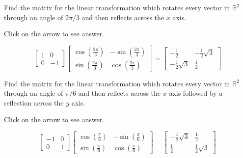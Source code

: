 \documentclass{ximera}
\begin{document}
\begin{problem}\label{prb:6.16} Find the matrix for the linear transformation which rotates every
vector in $\mathbb{R}^{2}$ through an angle of $2\pi /3$ and then reflects
across the $x$ axis.

Click on the arrow to see answer.
\begin{expandable}
\[
\left[
\begin{array}{rr}
1 & 0 \\
0 & -1
\end{array}
\right] \left[
\begin{array}{cc}
\cos \left( \frac{2\pi }{3}\right)  & -\sin \left( \frac{2\pi }{3}\right)
\\
\sin \left( \frac{2\pi }{3}\right)  & \cos \left( \frac{2\pi }{3}\right)
\end{array}
\right] = \left[
\begin{array}{cc}
-\frac{1}{2} & -\frac{1}{2}\sqrt{3} \\
-\frac{1}{2}\sqrt{3} & \frac{1}{2}
\end{array}
\right]
\]
\end{expandable}
\end{problem}

\begin{problem}\label{prb:6.19} Find the matrix for the linear transformation which rotates every
vector in $\mathbb{R}^{2}$ through an angle of $\pi /6$ and then reflects
across the $x$ axis followed by a reflection across the $y$ axis.

Click on the arrow to see answer.
\begin{expandable}
\[
\left[
\begin{array}{rr}
-1 & 0 \\
0 & 1
\end{array}
\right] \left[
\begin{array}{cc}
\cos \left( \frac{\pi }{6}\right)  & -\sin \left( \frac{\pi }{6}\right)  \\
\sin \left( \frac{\pi }{6}\right)  & \cos \left( \frac{\pi }{6}\right)
\end{array}
\right] = \left[
\begin{array}{cc}
-\frac{1}{2}\sqrt{3} & \frac{1}{2} \\
\frac{1}{2} & \frac{1}{2}\sqrt{3}
\end{array}
\right]
\]
\end{expandable}
\end{problem}
\end{document}
